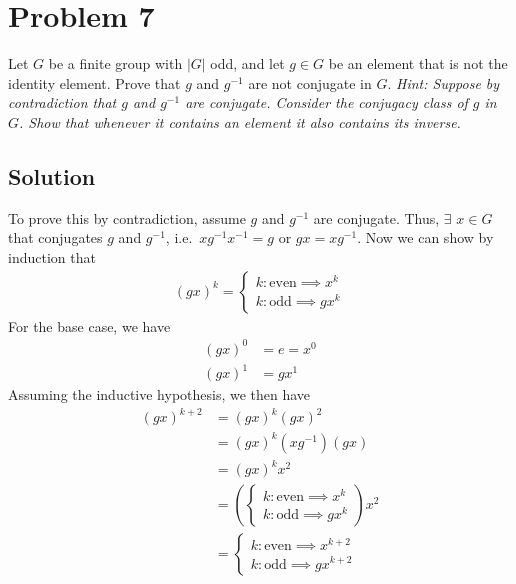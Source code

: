 \documentclass[fleqn]{article}
\begin{document}
    \pagebreak
    
    \section{Problem 7}
    Let $G$ be a finite group with $|G|$ odd, and let $g \in G$ be an element that is not the identity element.  Prove that $g$ and $g^{-1}$ are not conjugate in $G$.  \textit{Hint: Suppose by contradiction that $g$ and $g^{-1}$ are conjugate.  Consider the conjugacy class of $g$ in $G$.  Show that whenever it contains an element it also contains its inverse.}
        
        \subsection{Solution}
        To prove this by contradiction, assume $g$ and $g^{-1}$ are conjugate.  Thus, $\exists$ $x \in G$ that conjugates $g$ and $g^{-1}$, i.e.\ $xg^{-1}x^{-1} = g$ or $gx = xg^{-1}$.  Now we can show by induction that
        \begin{align}
            (gx)^k = \begin{cases}
                k: \text{even} \implies x^k \\
                k: \text{odd} \implies gx^k
            \end{cases}
        \end{align}
        For the base case, we have
        \begin{align}
            (gx)^0 &= e = x^0 \\
            (gx)^1 &= gx^1
        \end{align}
        Assuming the inductive hypothesis, we then have
        \begin{align}
            (gx)^{k + 2} &= (gx)^k (gx)^2 \\
                &= (gx)^k (xg^{-1})(gx) \\
                &= (gx)^k x^2 \\
                &= \left(\begin{cases}
                    k: \text{even} \implies x^k \\
                    k: \text{odd} \implies gx^k
                \end{cases}\right) x^2 \\
                &= \begin{cases}
                    k: \text{even} \implies x^{k + 2} \\
                    k: \text{odd} \implies gx^{k + 2}
                \end{cases}
        \end{align}
\end{document}
